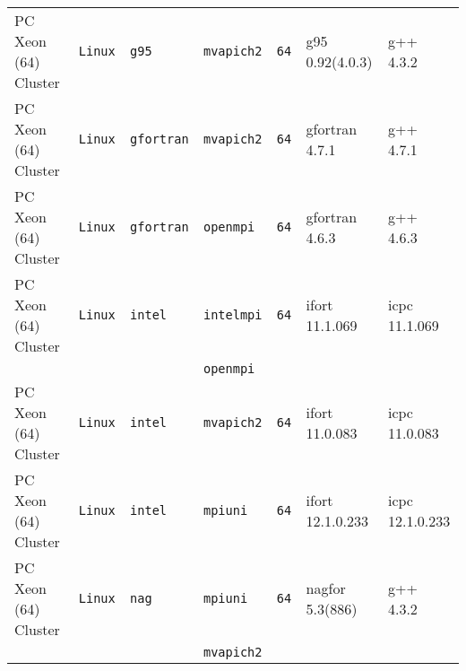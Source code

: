\begin{longtable}{lllllll}
PC Xeon (64) Cluster  &\tt Linux  &\tt g95          &\tt mvapich2   &\tt 64              & g95 \footnotesize 0.92(4.0.3)      & g++ \footnotesize 4.3.2         \\ %
PC Xeon (64) Cluster  &\tt Linux  &\tt gfortran     &\tt mvapich2   &\tt 64              & gfortran \footnotesize 4.7.1       & g++ \footnotesize 4.7.1         \\ %
PC Xeon (64) Cluster  &\tt Linux  &\tt gfortran     &\tt openmpi    &\tt 64              & gfortran \footnotesize 4.6.3       & g++ \footnotesize 4.6.3         \\ %
PC Xeon (64) Cluster  &\tt Linux  &\tt intel        &\tt intelmpi   &\tt 64              & ifort \footnotesize 11.1.069       & icpc \footnotesize 11.1.069     \\ %
                      &           &                 &\tt openmpi    &                    &                                    &                                 \\
PC Xeon (64) Cluster  &\tt Linux  &\tt intel        &\tt mvapich2   &\tt 64              & ifort \footnotesize 11.0.083       & icpc \footnotesize 11.0.083     \\ %
PC Xeon (64) Cluster  &\tt Linux  &\tt intel        &\tt mpiuni     &\tt 64              & ifort \footnotesize 12.1.0.233     & icpc \footnotesize 12.1.0.233   \\ %
PC Xeon (64) Cluster  &\tt Linux  &\tt nag          &\tt mpiuni     &\tt 64              & nagfor \footnotesize 5.3(886)      & g++  \footnotesize 4.3.2        \\ %
                      &           &                 &\tt mvapich2   &                    &                                    &                                 \\

\end{longtable}

